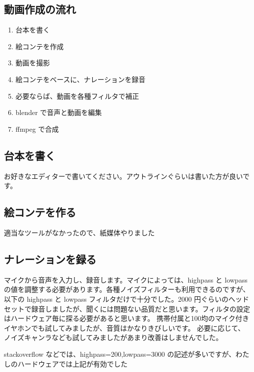 \documentclass[mingoth,a4paper]{jsarticle}
\begin{document}
\subsection{動画作成の流れ}

\begin{enumerate}
\item{台本を書く}
\item{絵コンテを作成}
\item{動画を撮影}
\item{絵コンテをベースに、ナレーションを録音}
\item{必要ならば、動画を各種フィルタで補正}
\item{blender で音声と動画を編集}
\item{ffmpeg で合成}
\end{enumerate}

\subsection{台本を書く}
お好きなエディターで書いてください。アウトラインぐらいは書いた方が良いです。

\subsection{絵コンテを作る}
適当なツールがなかったので、紙媒体やりました

\subsection{ナレーションを録る}
マイクから音声を入力し、録音します。マイクによっては、highpass と lowpass の値を調整する必要があります。各種ノイズフィルターも利用できるのですが、以下の highpass と lowpass フィルタだけで十分でした。2000 円ぐらいのヘッドセットで録音しましたが、聞くには問題ない品質だと思います。フィルタの設定はハードウェア毎に探る必要があると思います。
携帯付属と100均のマイク付きイヤホンでも試してみましたが、音質はかなりきびしいです。
必要に応じて、ノイズキャンラなども試してみましたがあまり改善はしませんでした。

stackoverflow などでは、highpass=200,lowpass=3000 の記述が多いですが、わたしのハードウェアでは上記が有効でした
\end{document}
